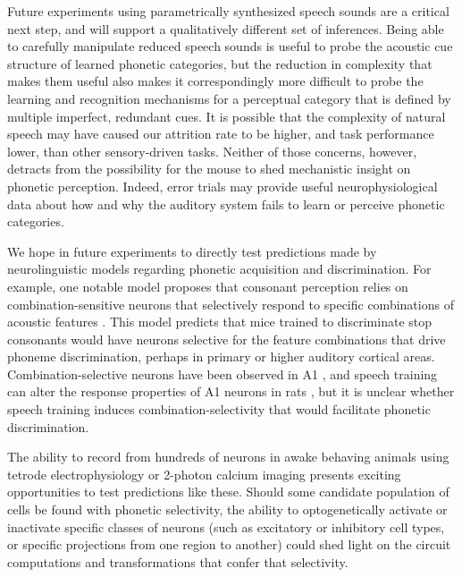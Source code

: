 Future experiments using parametrically synthesized speech sounds are a critical next step, and will support a qualitatively different set of inferences. Being able to carefully manipulate reduced speech sounds is useful to probe the acoustic cue structure of learned phonetic categories, but the reduction in complexity that makes them useful also makes it correspondingly more difficult to probe the learning and recognition mechanisms for a perceptual category that is defined by multiple imperfect, redundant cues. It is possible that the complexity of natural speech may have caused our attrition rate to be higher, and task performance lower, than other sensory-driven tasks. Neither of those concerns, however, detracts from the possibility for the mouse to shed mechanistic insight on phonetic perception. Indeed, error trials may provide useful neurophysiological data about how and why the auditory system fails to learn or perceive phonetic categories.

We hope in future experiments to directly test predictions made by neurolinguistic models regarding phonetic acquisition and discrimination. For example, one notable model proposes that consonant perception relies on combination-sensitive neurons that selectively respond to specific combinations of acoustic features \citep{Sussman1998}. This model predicts that mice trained to discriminate stop consonants would have neurons selective for the feature combinations that drive phoneme discrimination, perhaps in primary or higher auditory cortical areas. Combination-selective neurons have been observed in A1 \citep{Sadagopan2009,Wang2005a}, and speech training can alter the response properties of A1 neurons in rats \citep{Engineer2015}, but it is unclear whether speech training induces combination-selectivity that would facilitate phonetic discrimination.

The ability to record from hundreds of neurons in awake behaving animals using tetrode electrophysiology or 2-photon calcium imaging presents exciting opportunities to test predictions like these. Should some candidate population of cells be found with phonetic selectivity, the ability to optogenetically activate or inactivate specific classes of neurons (such as excitatory or inhibitory cell types, or specific projections from one region to another) could shed light on the circuit computations and transformations that confer that selectivity.

%
%
%
%
